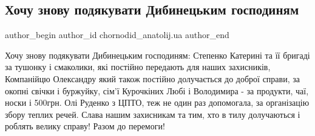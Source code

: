  
 
 
 
 
 
\subsection{Хочу знову подякувати Дибинецьким господиням}
\label{sec:28_12_2022.fb.chornodid_anatolij.ua.2.gospodyni}
 
\ifcmt
 author_begin
   author_id chornodid_anatolij.ua
 author_end
\fi

Хочу знову подякувати Дибинецьким господиням: Степенко Катерині та її бригаді
за тушонку і смаколики, які постійно передають для наших захисників, Компанійцю
Олександру який також постійно долучається до доброї справи, за окопні свічки і
буржуйку, сім'ї Курочкіних Любі і Володимира - за продукти, чаї, носки і
500грн. Олі Руденко з ЦПТО, теж не один раз допомогала, за організацію збору
теплих речей. Слава нашим захисникам та тим, хто в тилу долучаються і роблять
велику справу!  Разом до перемоги!

